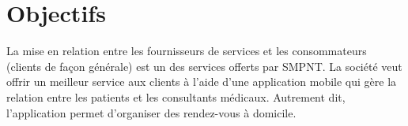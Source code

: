 \section{Objectifs}

La mise en relation entre les fournisseurs de services et les consommateurs (clients de façon générale) est un des services offerts par SMPNT. La société veut offrir un meilleur service aux clients à l'aide d'une application mobile qui gère la relation entre les patients et les consultants médicaux. Autrement dit, l'application permet d'organiser des rendez-vous à domicile.
